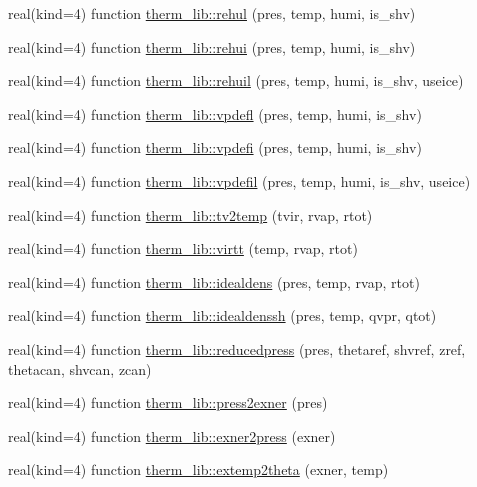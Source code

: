 \begin{DoxyCompactItemize}
\item 
real(kind=4) function \hyperlink{namespacetherm__lib_a28012fb3e93800daaed6b23dc389937c}{therm\+\_\+lib\+::rehul} (pres, temp, humi, is\+\_\+shv)
\item 
real(kind=4) function \hyperlink{namespacetherm__lib_a897c8c9126106d615513b59bf83c2dca}{therm\+\_\+lib\+::rehui} (pres, temp, humi, is\+\_\+shv)
\item 
real(kind=4) function \hyperlink{namespacetherm__lib_a41cd91c2aa39b6b956a791e3260e27e2}{therm\+\_\+lib\+::rehuil} (pres, temp, humi, is\+\_\+shv, useice)
\item 
real(kind=4) function \hyperlink{namespacetherm__lib_a6f84a6e1d410eb7f89dd59a9f6a13f3b}{therm\+\_\+lib\+::vpdefl} (pres, temp, humi, is\+\_\+shv)
\item 
real(kind=4) function \hyperlink{namespacetherm__lib_a638ed06adfde6beea4477cb9bddc699f}{therm\+\_\+lib\+::vpdefi} (pres, temp, humi, is\+\_\+shv)
\item 
real(kind=4) function \hyperlink{namespacetherm__lib_af6ca165844a5da4f2d21a37aa3fff081}{therm\+\_\+lib\+::vpdefil} (pres, temp, humi, is\+\_\+shv, useice)
\item 
real(kind=4) function \hyperlink{namespacetherm__lib_a0ac9a85555ff45eb6d4de4ca94045eb8}{therm\+\_\+lib\+::tv2temp} (tvir, rvap, rtot)
\item 
real(kind=4) function \hyperlink{namespacetherm__lib_adfb18489c8037340578e62f5643197f7}{therm\+\_\+lib\+::virtt} (temp, rvap, rtot)
\item 
real(kind=4) function \hyperlink{namespacetherm__lib_a5a9775d62adebc1ad0473596c7f51649}{therm\+\_\+lib\+::idealdens} (pres, temp, rvap, rtot)
\item 
real(kind=4) function \hyperlink{namespacetherm__lib_a60b714e3ae5457604df59afaf6904acd}{therm\+\_\+lib\+::idealdenssh} (pres, temp, qvpr, qtot)
\item 
real(kind=4) function \hyperlink{namespacetherm__lib_ad37c9d26367d1a2678cd1875d21f05fd}{therm\+\_\+lib\+::reducedpress} (pres, thetaref, shvref, zref, thetacan, shvcan, zcan)
\item 
real(kind=4) function \hyperlink{namespacetherm__lib_a4e2091a1a5d89a568a252369122ecb39}{therm\+\_\+lib\+::press2exner} (pres)
\item 
real(kind=4) function \hyperlink{namespacetherm__lib_ae8677da076662844975419a4a4c74919}{therm\+\_\+lib\+::exner2press} (exner)
\item 
real(kind=4) function \hyperlink{namespacetherm__lib_a547dc1767e5cae792b356d615db3ea09}{therm\+\_\+lib\+::extemp2theta} (exner, temp)

\end{DoxyCompactItemize}

